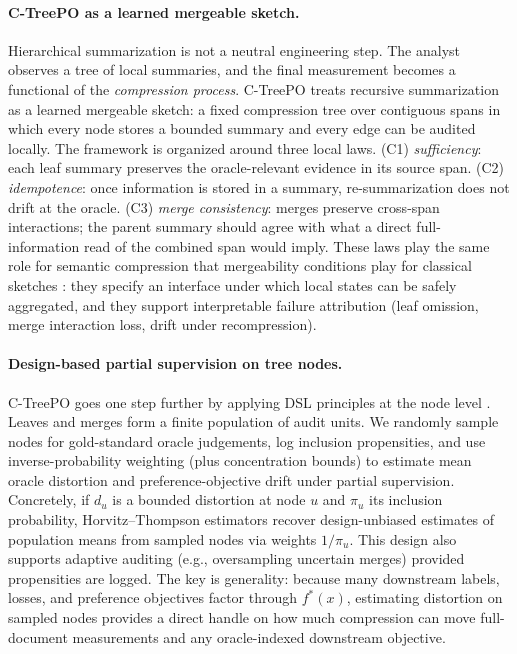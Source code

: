 \documentclass[11pt]{article}
\newcommand{\fstar}{f^\ast}
\begin{document}
\paragraph{C-TreePO as a learned mergeable sketch.}
Hierarchical summarization is not a neutral engineering step. The analyst observes a tree of local summaries, and the final measurement becomes a functional of the \emph{compression process}. C-TreePO treats recursive summarization as a learned mergeable sketch: a fixed compression tree over contiguous spans in which every node stores a bounded summary and every edge can be audited locally. The framework is organized around three local laws. (C1) \emph{sufficiency}: each leaf summary preserves the oracle-relevant evidence in its source span. (C2) \emph{idempotence}: once information is stored in a summary, re-summarization does not drift at the oracle. (C3) \emph{merge consistency}: merges preserve cross-span interactions; the parent summary should agree with what a direct full-information read of the combined span would imply. These laws play the same role for semantic compression that mergeability conditions play for classical sketches \citep{Agarwal2013MergeableTODS}: they specify an interface under which local states can be safely aggregated, and they support interpretable failure attribution (leaf omission, merge interaction loss, drift under recompression).

\paragraph{Design-based partial supervision on tree nodes.}
C-TreePO goes one step further by applying DSL principles at the node level \citep{EgamiEtAl2024}. Leaves and merges form a finite population of audit units. We randomly sample nodes for gold-standard oracle judgements, log inclusion propensities, and use inverse-probability weighting (plus concentration bounds) to estimate mean oracle distortion and preference-objective drift under partial supervision. Concretely, if $d_u$ is a bounded distortion at node $u$ and $\pi_u$ its inclusion probability, Horvitz--Thompson estimators recover design-unbiased estimates of population means from sampled nodes via weights $1/\pi_u$. This design also supports adaptive auditing (e.g., oversampling uncertain merges) provided propensities are logged. The key is generality: because many downstream labels, losses, and preference objectives factor through $\fstar(x)$, estimating distortion on sampled nodes provides a direct handle on how much compression can move full-document measurements and any oracle-indexed downstream objective.
\end{document}
